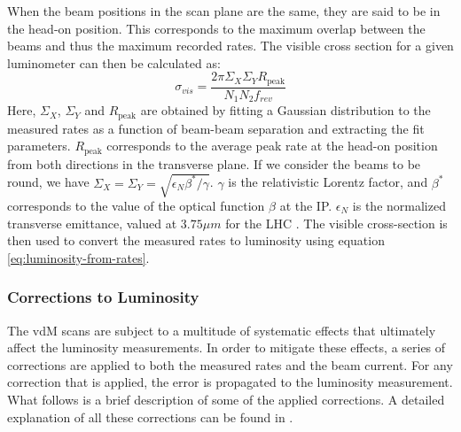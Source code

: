 When the beam positions in the scan plane are the same, they are said to be in the head-on position. This corresponds to the maximum overlap between the beams and thus the maximum recorded rates. The visible cross section for a given luminometer can then be calculated as:
\begin{equation}
    \label{eq:vis-cross-section-vdm}
    \sigma_{vis} = \frac{2 \pi \Sigma_X \Sigma_Y R_{\mathrm{peak}}}{N_1 N_2 f_{rev}}
\end{equation}
Here, $\Sigma_X$, $\Sigma_Y$ and $R_{\mathrm{peak}}$ are obtained by fitting a Gaussian distribution to the measured rates as a function of beam-beam separation and extracting the fit parameters. $R_{\mathrm{peak}}$ corresponds to the average peak rate at the head-on position from both directions in the transverse plane. If we consider the beams to be round, we have $\Sigma_X = \Sigma_Y = \sqrt{\epsilon_N \beta^*/ \gamma}$. $\gamma$ is the relativistic Lorentz factor, and $\beta^*$ corresponds to the value of the optical function $\beta$ at the IP. $\epsilon_N$ is the normalized transverse emittance, valued at $3.75 \mu m$ for the LHC \cite{Brüning:782076}. The visible cross-section is then used to convert the measured rates to luminosity using equation \ref{eq:luminosity-from-rates}.

\subsubsection{Corrections to Luminosity}
\label{subsub:corrections}

The vdM scans are subject to a multitude of systematic effects that ultimately affect the luminosity measurements. In order to mitigate these effects, a series of corrections are applied to both the measured rates and the beam current. For any correction that is applied, the error is propagated to the luminosity measurement. What follows is a brief description of some of the applied corrections. A detailed explanation of all these corrections can be found in \cite{Sirunyan:2759951,Saariokari:2826125}.



